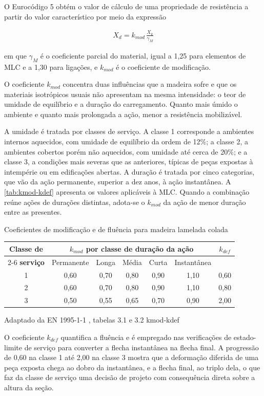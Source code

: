 O Eurocódigo 5 obtém o valor de cálculo de uma propriedade de resistência a
partir do valor característico por meio da expressão

\begin{align}
    X_d = k_{mod}\,\frac{X_k}{\gamma_M} \label{eq:valor-calculo}
\end{align}

\noindent
em que $\gamma_M$ é o coeficiente parcial do material, igual a 1,25 para
elementos de MLC e a 1,30 para ligações, e $k_{mod}$ é o coeficiente de
modificação.

O coeficiente $k_{mod}$ concentra duas influências que a madeira sofre e que os
materiais isotrópicos usuais não apresentam na mesma intensidade: o teor de
umidade de equilíbrio e a duração do carregamento. Quanto mais úmido o ambiente
e quanto mais prolongada a ação, menor a resistência mobilizável.

A umidade é tratada por classes de serviço. A classe 1 corresponde a ambientes
internos aquecidos, com umidade de equilíbrio da ordem de 12\%; a classe 2, a
ambientes cobertos porém não aquecidos, com umidade até cerca de 20\%; e a
classe 3, a condições mais severas que as anteriores, típicas de peças expostas
à intempérie ou em edificações abertas. A duração é tratada por cinco
categorias, que vão da ação permanente, superior a dez anos, à ação
instantânea. A \autoref{tab:kmod-kdef} apresenta os valores aplicáveis à MLC.
Quando a combinação reúne ações de durações distintas, adota-se o $k_{mod}$ da
ação de menor duração entre as presentes.

\tabela
{Coeficientes de modificação e de fluência para madeira lamelada colada}
{\footnotesize
\begin{tabular}{ccccccc}
\toprule
    \textbf{Classe de} & \multicolumn{5}{c}{\textbf{$k_{mod}$ por classe de duração da ação}} & \textbf{$k_{def}$} \\
\cmidrule(lr){2-6}
    \textbf{serviço} & Permanente & Longa & Média & Curta & Instantânea & \\
\midrule
    1 & 0,60 & 0,70 & 0,80 & 0,90 & 1,10 & 0,60 \\
    2 & 0,60 & 0,70 & 0,80 & 0,90 & 1,10 & 0,80 \\
    3 & 0,50 & 0,55 & 0,65 & 0,70 & 0,90 & 2,00 \\
\bottomrule
\end{tabular}}
{Adaptado da EN 1995-1-1 \cite{EN1995-1-1:2004}, tabelas 3.1 e 3.2}
{kmod-kdef}
{}
{}

O coeficiente $k_{def}$ quantifica a fluência e é empregado nas verificações de
estado-limite de serviço para converter a flecha instantânea na flecha final. A
progressão de 0,60 na classe 1 até 2,00 na classe 3 mostra que a deformação
diferida de uma peça exposta chega ao dobro da instantânea, e a flecha final, ao
triplo dela, o que faz da
classe de serviço uma decisão de projeto com consequência direta sobre a altura
da seção.

